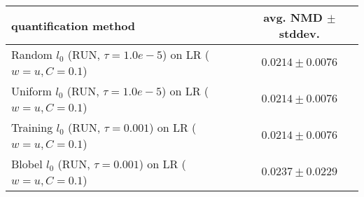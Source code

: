 \begin{tabular}{lc}
  \toprule
  quantification method & avg. NMD $\pm$ stddev. \\
  \midrule
  Random $l_0$ (RUN, $\tau=1.0e-5$) on LR ($w=u, C=0.1$) & $\mathbf{0.0214 \pm 0.0076}$ \\
  Uniform $l_0$ (RUN, $\tau=1.0e-5$) on LR ($w=u, C=0.1$) & $\mathbf{0.0214 \pm 0.0076}$ \\
  Training $l_0$ (RUN, $\tau=0.001$) on LR ($w=u, C=0.1$) & $0.0214 \pm 0.0076$ \\
  Blobel $l_0$ (RUN, $\tau=0.001$) on LR ($w=u, C=0.1$) & $0.0237 \pm 0.0229$ \\
  \bottomrule
\end{tabular}
